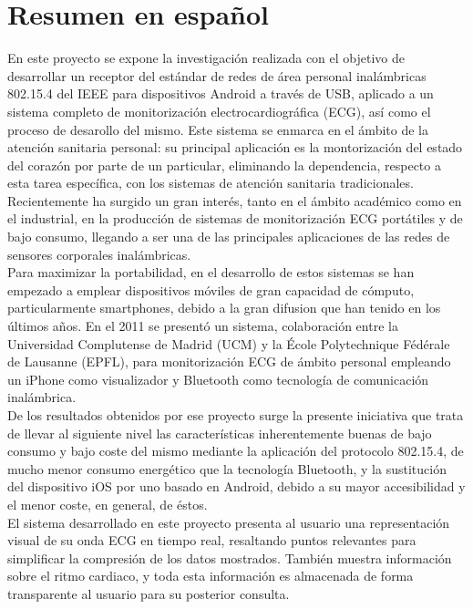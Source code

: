 \chapter{Resumen en español}
\label{ch:resumen}
	En este proyecto se expone la investigación realizada con el objetivo de desarrollar un receptor del estándar de redes de área personal inalámbricas 802.15.4 del IEEE para dispositivos Android a través de USB, aplicado a un sistema completo de monitorización electrocardiográfica (ECG), así como el proceso de desarollo del mismo. Este sistema se enmarca en el ámbito de la atención sanitaria personal: su principal aplicación es la montorización del estado del corazón por parte de un particular, eliminando la dependencia, respecto a esta tarea específica, con los sistemas de atención sanitaria tradicionales.\\

	Recientemente ha surgido un gran interés, tanto en el ámbito académico como en el industrial, en la producción de sistemas de monitorización ECG portátiles y de bajo consumo, llegando a ser una de las principales aplicaciones de las redes de sensores corporales inalámbricas.\\

	Para maximizar la portabilidad, en el desarrollo de estos sistemas se han empezado a emplear dispositivos móviles de gran capacidad de cómputo, particularmente smartphones, debido a la gran difusion que han tenido en los últimos años. En el 2011  se presentó un sistema, colaboración entre la Universidad Complutense de Madrid (UCM) y la École Polytechnique Fédérale de Lausanne (EPFL), para monitorización ECG de ámbito personal empleando un iPhone como visualizador y Bluetooth como tecnología de comunicación inalámbrica.\\

	De los resultados obtenidos por ese proyecto surge la presente iniciativa que trata de llevar al siguiente nivel las características inherentemente buenas de bajo consumo y bajo coste del mismo mediante la aplicación del protocolo 802.15.4, de mucho menor consumo energético que la tecnología Bluetooth, y la sustitución del dispositivo iOS por uno basado en Android, debido a su mayor accesibilidad y el menor coste, en general, de éstos.\\

	El sistema desarrollado en este proyecto presenta al usuario una representación visual de su onda ECG en tiempo real, resaltando puntos relevantes para simplificar la compresión de los datos mostrados. También muestra información sobre el ritmo cardiaco, y toda esta información es almacenada de forma transparente al usuario para su posterior consulta.\\

